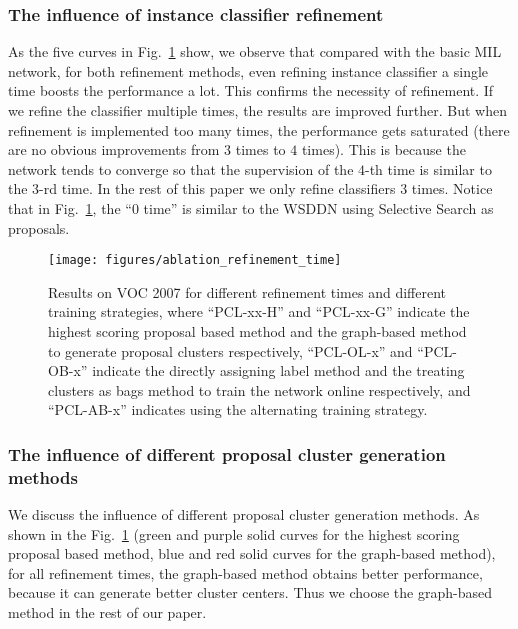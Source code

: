 \documentclass[10pt,journal,compsoc]{IEEEtran}
\def\methodname{PCL}
\begin{document}
\subsubsection{The influence of instance classifier refinement}
\label{sec:influence_lp}

As the five curves in Fig.~\ref{fig:ablation_refinement_time} show,
we observe that compared with the basic MIL network,
for both refinement methods,
even refining instance classifier a single time boosts the performance a lot.
This confirms the necessity of refinement.
If we refine the classifier multiple times, the results are improved further.
But when refinement is implemented too many times,
the performance gets saturated (there are no obvious improvements from $3$ times to $4$ times).
This is because the network tends to converge so that the supervision of the $4$-th time is similar to the $3$-rd time.
In the rest of this paper we only refine classifiers $3$ times.
Notice that in Fig.~\ref{fig:ablation_refinement_time},
the ``0 time'' is similar to the WSDDN \cite{Ref:Bilen2016} using Selective Search as proposals.


\begin{figure}[t]
\begin{center}
   \texttt{[image: figures/ablation\_refinement\_time]}
\end{center}
   \caption{Results on VOC 2007 for different refinement times and different training strategies,
   where ``\methodname-xx-H'' and ``\methodname-xx-G'' indicate the highest scoring proposal based method and the graph-based method to generate proposal clusters respectively,
   ``\methodname-OL-x'' and ``\methodname-OB-x'' indicate the directly assigning label method and the treating clusters as bags method to train the network online respectively,
   and ``\methodname-AB-x'' indicates using the alternating training strategy.}
\label{fig:ablation_refinement_time}
\end{figure}




\subsubsection{The influence of different proposal cluster generation methods}

We discuss the influence of different proposal cluster generation methods.
As shown in the Fig.~\ref{fig:ablation_refinement_time}
({green and purple solid curves for the highest scoring proposal based method, blue and red solid curves for the graph-based method}),
for all refinement times,
the graph-based method obtains better performance, because it can generate better cluster centers.
Thus we choose the graph-based method in the rest of our paper.
\end{document}

